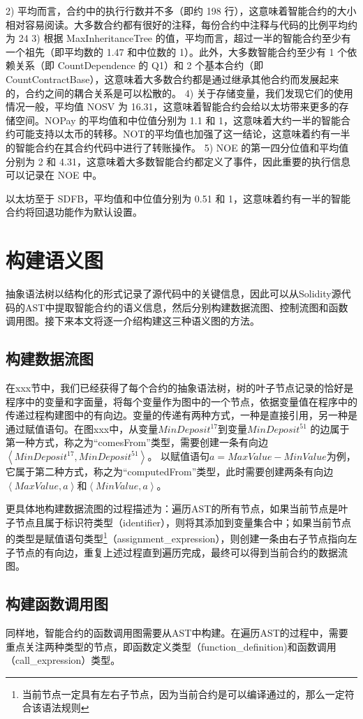 2) 平均而言，合约中的执行行数并不多（即约 198 行），这意味着智能合约的大小相对容易阅读。大多数合约都有很好的注释，每份合约中注释与代码的比例平均约为 24%
3) 根据 MaxInheritanceTree 的值，平均而言，超过一半的智能合约至少有一个祖先（即平均数的 1.47 和中位数的 1）。此外，大多数智能合约至少有 1 个依赖关系（即 CountDependence 的 Q1）和 2 个基本合约（即 CountContractBase），这意味着大多数合约都是通过继承其他合约而发展起来的，合约之间的耦合关系是可以松散的。
4) 关于存储变量，我们发现它们的使用情况一般，平均值 NOSV 为 16.31，这意味着智能合约会给以太坊带来更多的存储空间。NOPay 的平均值和中位值分别为 1.1 和 1，这意味着大约一半的智能合约可能支持以太币的转移。NOT的平均值也加强了这一结论，这意味着约有一半的智能合约在其合约代码中进行了转账操作。
5) NOE 的第一四分位值和平均值分别为 2 和 4.31，这意味着大多数智能合约都定义了事件，因此重要的执行信息可以记录在 NOE 中。


以太坊至于 SDFB，平均值和中位值分别为 0.51 和 1，这意味着约有一半的智能合约将回退功能作为默认设置。
\section{构建语义图}
抽象语法树以结构化的形式记录了源代码中的关键信息，因此可以从Solidity源代码的AST中提取智能合约的语义信息，然后分别构建数据流图、控制流图和函数调用图。接下来本文将逐一介绍构建这三种语义图的方法。
\subsection{构建数据流图}
在xxx节中，我们已经获得了每个合约的抽象语法树，树的叶子节点记录的恰好是程序中的变量和字面量，将每个变量作为图中的一个节点，依据变量值在程序中的传递过程构建图中的有向边。变量的传递有两种方式，一种是直接引用，另一种是通过赋值语句。在图xxx中，从变量$MinDeposit^{17}$到变量$MinDeposit^{51}$ 的边属于第一种方式，称之为“comesFrom”类型，需要创建一条有向边$\left\langle MinDeposit^{17}, MinDeposit^{51}\right\rangle$。
以赋值语句$a=MaxValue-MinValue$为例，它属于第二种方式，称之为“computedFrom”类型，此时需要创建两条有向边$\left\langle MaxValue,a\right\rangle$和$\left\langle MinValue,a\right\rangle$。

更具体地构建数据流图的过程描述为：遍历AST的所有节点，如果当前节点是叶子节点且属于标识符类型（identifier），则将其添加到变量集合中；如果当前节点的类型是赋值语句类型\footnote{当前节点一定具有左右子节点，因为当前合约是可以编译通过的，那么一定符合该语法规则}（assignment\_expression），则创建一条由右子节点指向左子节点的有向边，重复上述过程直到遍历完成，最终可以得到当前合约的数据流图。
\subsection{构建函数调用图}
同样地，智能合约的函数调用图需要从AST中构建。在遍历AST的过程中，需要重点关注两种类型的节点，即函数定义类型（function\_definition)和函数调用（call\_expression）类型。

